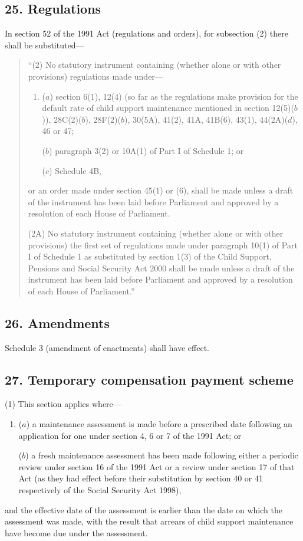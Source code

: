 \documentclass[12pt,a4paper]{article}
\begin{document}
\subsection{25. Regulations}

In section 52 of the 1991 Act (regulations and orders), for subsection (2)  there shall be substituted—
\begin{quotation}
“(2) No statutory instrument containing (whether alone or with other provisions) regulations made under—
\begin{enumerate}\item[]
($a$) section 6(1), 12(4)  (so far as the regulations make provision for the default rate of child support maintenance mentioned in section 12(5)($b$)), 28C(2)($b$), 28F(2)($b$), 30(5A), 41(2), 41A, 41B(6), 43(1), 44(2A)($d$), 46 or 47;

($b$) paragraph 3(2)  or 10A(1)  of Part I of Schedule 1; or

($c$) Schedule 4B,
\end{enumerate}
or an order made under section 45(1)  or (6), shall be made unless a draft of the instrument has been laid before Parliament and approved by a resolution of each House of Parliament.

(2A) No statutory instrument containing (whether alone or with other provisions) the first set of regulations made under paragraph 10(1)  of Part I of Schedule 1 as substituted by section 1(3)  of the Child Support, Pensions and Social Security Act 2000 shall be made unless a draft of the instrument has been laid before Parliament and approved by a resolution of each House of Parliament.”
\end{quotation}


\subsection{26. Amendments}

Schedule 3 (amendment of enactments) shall have effect.

\subsection{27. Temporary compensation payment scheme}

(1) This section applies where—
\begin{enumerate}\item[]
($a$) a maintenance assessment is made before a prescribed date following an application for one under section 4, 6 or 7 of the 1991 Act; or

($b$) a fresh maintenance assessment has been made following either a periodic review under section 16 of the 1991 Act or a review under section 17 of that Act (as they had effect before their substitution by section 40 or 41 respectively of the Social Security Act 1998),
\end{enumerate}
and the effective date of the assessment is earlier than the date on which the assessment was made, with the result that arrears of child support maintenance have become due under the assessment.
\end{document}
